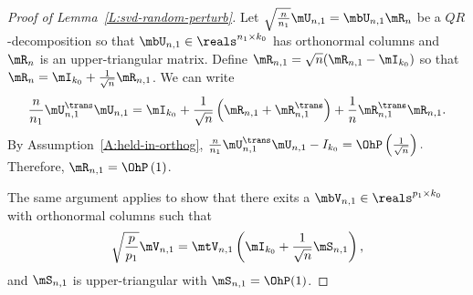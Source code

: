 \begin{proof}[Proof of Lemma~\ref{L:svd-random-perturb}]
    Let $\sqrt{\frac{n}{n_1}} \mU_{n,1} = \mbU_{n,1} \mR_n$ be a 
    $QR$-decomposition so that $\mbU_{n,1} \in \reals^{n_1 \times k_0}$ has
    orthonormal columns and $\mR_n$ is an upper-triangular matrix.  Define
    $\mR_{n,1} = \sqrt{n} ( \mR_{n,1} - \mI_{k_0})$ so that
    $\mR_n = \mI_{k_0} + \frac{1}{\sqrt{n}} \mR_{n,1}$.  We can write
    \[
        \frac{n}{n_1}
        \mU_{n,1}^\trans \mU_{n,1}
            =
                \mI_{k_0}
                +
                \frac{1}{\sqrt{n}}
                \left(
                    \mR_{n,1}
                    +
                    \mR_{n,1}^\trans
                \right)
                +
                \frac{1}{n}
                \mR_{n,1}^\trans \mR_{n,1}.
    \]
    By Assumption~\ref{A:held-in-orthog},
    \(
        \frac{n}{n_1} \mU_{n,1}^\trans \mU_{n,1}
        -
        I_{k_0}
        =
        \OhP\left( \frac{1}{\sqrt{n}} \right).
    \)
    Therefore, $\mR_{n,1} = \OhP\left( 1 \right)$.
    
    The same argument applies to show that there exits a
    $\mbV_{n,1} \in \reals^{p_1 \times k_0}$ with orthonormal columns
    such that
    \[
        \sqrt{\frac{p}{p_1}} \mV_{n,1} 
            =
            \mtV_{n,1}
            \left(
                \mI_{k_0}
                +
                \frac{1}{\sqrt{n}}
                \mS_{n,1}
            \right),
    \]
    and $\mS_{n,1}$ is upper-triangular with $\mS_{n,1} = \OhP(1)$.
    

\end{proof}
